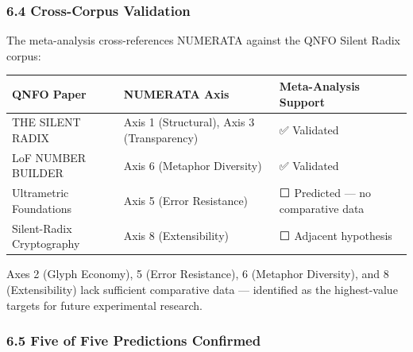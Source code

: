 \documentclass[
]{article}
\newcounter{none} %
\begin{document}
\subsubsection{6.4 Cross-Corpus
Validation}\label{cross-corpus-validation}

The meta-analysis cross-references NUMERATA against the QNFO Silent
Radix corpus:

{\def\LTcaptype{none} %
\begin{longtable}[]{@{}
  >{\raggedright\arraybackslash}p{}
  >{\raggedright\arraybackslash}p{}
  >{\raggedright\arraybackslash}p{}@{}}
\toprule\noalign{}
\begin{minipage}[b]{\linewidth}\raggedright
QNFO Paper
\end{minipage} & \begin{minipage}[b]{\linewidth}\raggedright
NUMERATA Axis
\end{minipage} & \begin{minipage}[b]{\linewidth}\raggedright
Meta-Analysis Support
\end{minipage} \\
\midrule\noalign{}
\endhead
\bottomrule\noalign{}
\endlastfoot
THE SILENT RADIX & Axis 1 (Structural), Axis 3 (Transparency) & ✅
Validated \\
LoF NUMBER BUILDER & Axis 6 (Metaphor Diversity) & ✅ Validated \\
Ultrametric Foundations & Axis 5 (Error Resistance) & ⬜ Predicted ---
no comparative data \\
Silent-Radix Cryptography & Axis 8 (Extensibility) & ⬜ Adjacent
hypothesis \\
\end{longtable}
}

Axes 2 (Glyph Economy), 5 (Error Resistance), 6 (Metaphor Diversity),
and 8 (Extensibility) lack sufficient comparative data --- identified as
the highest-value targets for future experimental research.

\subsubsection{6.5 Five of Five Predictions
Confirmed}\label{five-of-five-predictions-confirmed}
\end{document}
